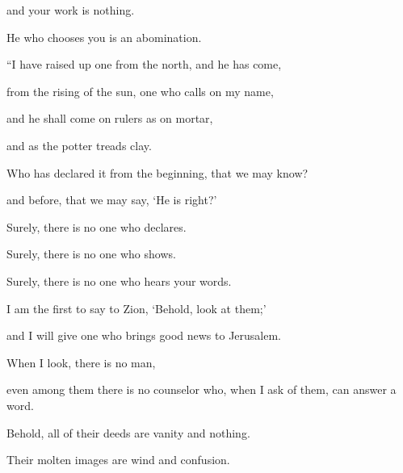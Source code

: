 {\par }{\QB and your work is nothing.
\par }{\QB He who chooses you is an abomination.
\par }{\BB \par }{\Q {}“I have raised up one from the north, and he has come,
\par }{\QB from the rising of the sun, one who calls on my name,
\par }{\QB and he shall come on rulers as on mortar,
\par }{\QB and as the potter treads clay.
\par }{\Q {}Who has declared it from the beginning, that we may know?
\par }{\QB and before, that we may say, ‘He is right?’
\par }{\Q Surely, there is no one who declares.
\par }{\QB Surely, there is no one who shows.
\par }{\QB Surely, there is no one who hears your words.
\par }{\Q {}I am the first to say to Zion, ‘Behold, look at them;’
\par }{\QB and I will give one who brings good news to Jerusalem.
\par }{\Q {}When I look, there is no man,
\par }{\QB even among them there is no counselor who, when I ask of them, can answer a word.
\par }{\Q {}Behold, all of their deeds are vanity and nothing.
\par }{\QB Their molten images are wind and confusion.

}
